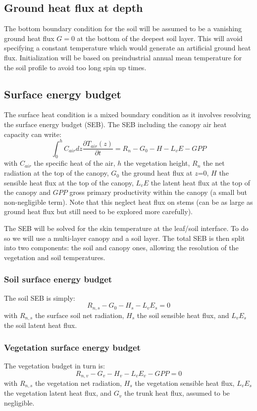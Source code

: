 \documentclass{article}
\begin{document}
\subsection{Ground heat flux at depth}
The bottom boundary condition for the soil will be assumed to be a vanishing ground heat flux $G=0$ at the bottom of the deepest soil layer. This will avoid specifying a constant temperature which would generate an artificial ground heat flux. Initialization will be based on preindustrial annual mean temperature for the soil profile to avoid too long spin up times.

\subsection{Surface energy budget}
The surface heat condition is a mixed boundary condition as it involves resolving the surface energy budget (SEB). The SEB including the canopy air heat capacity can write:
\begin{equation}
    \int_0^h{C_{air}dz \frac{\partial T_{air}(z)}{\partial t}} = R_n - G_0 - H - L_vE - GPP 
\end{equation}
with $C_{air}$ the specific heat of the air, $h$ the vegetation height, $R_n$ the net radiation at the top of the canopy, $G_0$ the ground heat flux at $z$=0, $H$ the sensible heat flux at the top of the canopy, $L_vE$ the latent heat flux at the top of the canopy and $GPP$ gross primary productivity within the canopy (a small but non-negligible term). Note that this neglect heat flux on stems (can be as large as ground heat flux but still need to be explored more carefully).

 The SEB will be solved for the skin temperature at the leaf/soil interface. To do so we will use a multi-layer canopy and a soil layer.
 The total SEB is then split into two components: the soil and canopy ones, allowing the resolution of the vegetation and soil temperatures.
 
\subsubsection{Soil surface energy budget}
The soil SEB is simply:
\begin{equation}
     R_{n,s} - G_0 - H_s - L_vE_s = 0  
     \label{SEB:soil}
\end{equation}
with $R_{n,s}$ the surface soil net radiation, $H_s$ the soil sensible heat flux, and $L_vE_s$ the soil latent heat flux.

\subsubsection{Vegetation surface energy budget}
The vegetation budget in turn is:
\begin{equation}
     R_{n,v} - G_v - H_v - L_vE_v - GPP = 0  
     \label{SEB:veg}
\end{equation}
with $R_{n,s}$ the vegetation net radiation, $H_s$ the vegetation sensible heat flux, $L_vE_s$ the vegetation latent heat flux, and $G_v$ the trunk heat flux, assumed to be negligible. 
\end{document}
